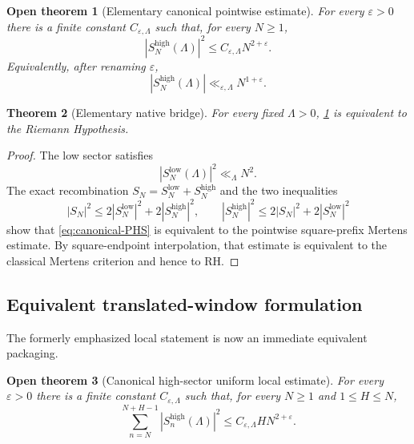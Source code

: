 \documentclass[11pt]{article}
\newtheorem{theorem}{Theorem}[section]
\newtheorem{conjecture}[theorem]{Open theorem}
\theoremstyle{definition}
\newcommand{\eps}{\varepsilon}
\newcommand{\1}{\mathbf{1}}
\begin{document}
\begin{conjecture}[Elementary canonical pointwise estimate]
\label{conj:canonical-PHS}
For every $\eps>0$ there is a finite constant $C_{\eps,\Lambda}$ such that, for every $N\ge1$,
\begin{equation}
 \boxed{
 \left|S_N^{\mathrm{high}}(\Lambda)\right|^2
 \le C_{\eps,\Lambda}N^{2+\eps}.
 }
 \tag{PHS}
 \label{eq:canonical-PHS}
\end{equation}
Equivalently, after renaming $\eps$,
\begin{equation}
 \left|S_N^{\mathrm{high}}(\Lambda)\right|
 \ll_{\eps,\Lambda}N^{1+\eps}.
 \label{eq:canonical-PHS-linear}
\end{equation}
\end{conjecture}

\begin{theorem}[Elementary native bridge]
\label{thm:canonical-PHS-iff-RH}
For every fixed $\Lambda>0$, \cref{conj:canonical-PHS} is equivalent to the Riemann Hypothesis.
\end{theorem}

\begin{proof}
The low sector satisfies
\[
 |S_N^{\mathrm{low}}(\Lambda)|^2
 \ll_\Lambda N^2.
\]
The exact recombination $S_N=S_N^{\mathrm{low}}+S_N^{\mathrm{high}}$ and the two inequalities
\[
 |S_N|^2\le2|S_N^{\mathrm{low}}|^2+2|S_N^{\mathrm{high}}|^2,
 \qquad
 |S_N^{\mathrm{high}}|^2\le2|S_N|^2+2|S_N^{\mathrm{low}}|^2
\]
show that \cref{eq:canonical-PHS} is equivalent to the pointwise square-prefix Mertens estimate.  By square-endpoint interpolation, that estimate is equivalent to the classical Mertens criterion and hence to RH.
\end{proof}

\subsection{Equivalent translated-window formulation}

The formerly emphasized local statement is now an immediate equivalent packaging.

\begin{conjecture}[Canonical high-sector uniform local estimate]
\label{conj:canonical-HS}
For every $\eps>0$ there is a finite constant $C_{\eps,\Lambda}$ such that, for every $N\ge1$ and $1\le H\le N$,
\begin{equation}
 \boxed{
 \sum_{n=N}^{N+H-1}
 \left|S_n^{\mathrm{high}}(\Lambda)\right|^2
 \le C_{\eps,\Lambda}HN^{2+\eps}.
 }
 \tag{HS}
 \label{eq:canonical-HS}
\end{equation}
\end{conjecture}
\end{document}
